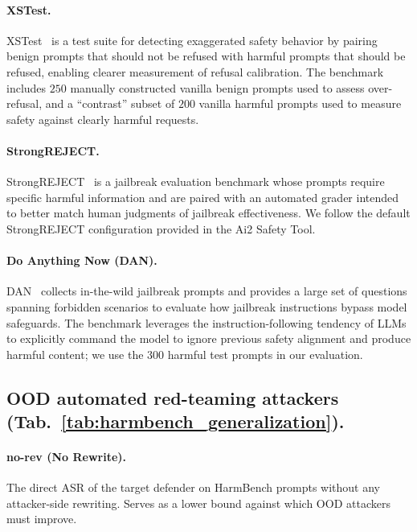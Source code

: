 \documentclass{article}
\begin{document}
\paragraph{XSTest.} XSTest~\citep{rottger2023xstest} is a test suite for detecting exaggerated safety behavior by pairing benign prompts that should not be refused with harmful prompts that should be refused, enabling clearer measurement of refusal calibration. The benchmark includes $250$ manually constructed vanilla benign prompts used to assess over-refusal, and a ``contrast'' subset of $200$ vanilla harmful prompts used to measure safety against clearly harmful requests.

\paragraph{StrongREJECT.} StrongREJECT~\citep{souly2024strongreject} is a jailbreak evaluation benchmark whose prompts require specific harmful information and are paired with an automated grader intended to better match human judgments of jailbreak effectiveness. We follow the default StrongREJECT configuration provided in the Ai2 Safety Tool.

\paragraph{Do Anything Now (DAN).} DAN~\citep{shen2023doanythingnow} collects in-the-wild jailbreak prompts and provides a large set of questions spanning forbidden scenarios to evaluate how jailbreak instructions bypass model safeguards. The benchmark leverages the instruction-following tendency of LLMs to explicitly command the model to ignore previous safety alignment and produce harmful content; we use the $300$ harmful test prompts in our evaluation.

\subsection{OOD automated red-teaming attackers (Tab.~\ref{tab:harmbench_generalization}).}
\label{apdx:bench-openrt}

\paragraph{no-rev (No Rewrite).} The direct ASR of the target defender on HarmBench prompts without any attacker-side rewriting. Serves as a lower bound against which OOD attackers must improve.
\end{document}
